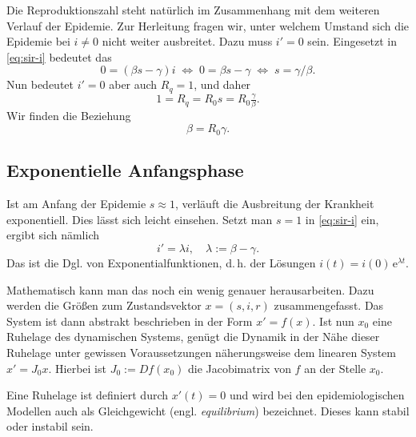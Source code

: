 \documentclass[a4paper,10pt,fleqn,twocolumn,twoside,dvipdfmx]{scrartcl}
\numberwithin{equation}{section}
\newcommand{\ee}{\mathrm e}
\begin{document}
Die Reproduktionszahl steht natürlich im Zusammenhang mit dem weiteren
Verlauf der Epidemie. Zur Herleitung fragen wir, unter welchem Umstand
sich die Epidemie bei $i\ne 0$ nicht weiter ausbreitet. Dazu muss
$i'=0$ sein. Eingesetzt in \eqref{eq:sir-i} bedeutet das%
\begin{equation}
0 = (\beta s - \gamma) i \;\Leftrightarrow\; 0 = \beta s - \gamma
\;\Leftrightarrow\; s = \gamma/\beta.
\end{equation}
Nun bedeutet $i'=0$ aber auch $R_q=1$, und daher %
\begin{equation}\label{eq:R0-beta-gamma-from-Rq}
1 = R_q = R_0 s = R_0 \tfrac{\gamma}{\beta}.
\end{equation}
Wir finden die Beziehung
\begin{equation}
\beta = R_0\gamma.
\end{equation}

\subsection{Exponentielle Anfangsphase}

Ist am Anfang der Epidemie $s\approx 1$, verläuft die Ausbreitung
der Krankheit exponentiell. Dies lässt sich leicht einsehen. Setzt
man $s=1$ in \eqref{eq:sir-i} ein, ergibt sich nämlich%
\begin{equation}\label{eq:i-ode-exp}
i' = \lambda i,\quad \lambda := \beta-\gamma.
\end{equation}
Das ist die Dgl. von Exponentialfunktionen, d.\,h. der Lösungen
$i(t) = i(0)\,\ee^{\lambda t}$.

Mathematisch kann man das noch ein wenig genauer herausarbeiten.
Dazu werden die Größen zum Zustandsvektor $x=(s,i,r)$ zusammengefasst.
Das System ist dann abstrakt beschrieben in der Form $x'=f(x)$. Ist
nun $x_0$ eine Ruhelage des dynamischen Systems, genügt die Dynamik
in der Nähe dieser Ruhelage unter gewissen Voraussetzungen
näherungsweise dem linearen System $x' = J_0 x$. Hierbei ist
$J_0:=Df(x_0)$ die Jacobimatrix von $f$ an der Stelle $x_0$.

Eine Ruhelage ist definiert durch $x'(t)=0$ und wird bei den
epidemiologischen Modellen auch als Gleichgewicht (engl.
\emph{equilibrium}) bezeichnet. Dieses kann stabil oder instabil sein.
\end{document}
